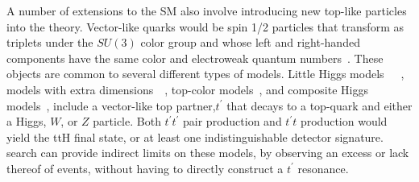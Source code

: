 \par A number of extensions to the SM also involve introducing new
top-like particles into the theory.  Vector-like quarks would be spin
1/2 particles that transform as triplets under the $SU(3)$ color group
and whose left and right-handed components have the same  
color and electroweak quantum
numbers~\cite{VectorLikeQuarks_Aguilar-Saavedra}.  These objects are
common to several different types of models.  Little Higgs
models~\cite{BSM_littleHiggs_Burdman}~\cite{BSM_littleHiggs_Perelstein}~\cite{BSM_littleHiggs_PhysRevD.74.055001}, 
models with extra
dimensions~\cite{BSM_extraD_Cheng:1999bg}~\cite{BSM_extraD_Carena:2006bn},
top-color models~\cite{BSM_topColor_Hill:1991at}, and composite Higgs
models~\cite{BSM_composite_Higgs_Contino:2006qr}, include a
vector-like top partner,$ t^{\prime}$ that decays to a top-quark and
either a Higgs, $W$, or $Z$ particle.  Both $t^{\prime}t^{\prime}$
pair production and $t^{\prime}t$ production would yield the ttH final
state, or at least one indistinguishable detector signature.  \ttH
search can provide indirect limits on these models, by observing an
excess or lack thereof of \ttH events, without having to directly
construct a $t^{\prime}$ resonance.  


      
